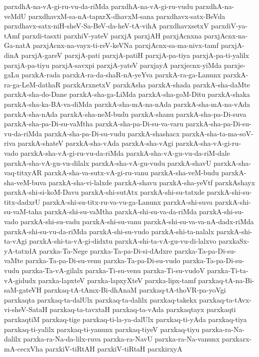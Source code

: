 {parxdhA-na-vA-gi-ru-vu-da-riMda
parxdhA-na-vA-gi-ru-vudu
parxdhA-na-veMdU
parxdhavxM-sa-nA-tapxrX-dhavxM-sana
parxdhavx-satx-BeVda
parxdhavx-satx-niH-sheV-Sa-BeV-da-heV-tA-vihA
parxdhavxsetxV
parxdiV-ya-tAmf
parxdi-tasxti
parxhiV-yateV
parxjA
parxjAH
parxjAcnxna
parxjAcnx-na-Ga-natA
parxjAcnx-na-vayx-ti-reV-keVNa
parxjAcnx-sa-ma-nivx-tamf
parxjA-dinA
parxjA-gareV
parxjA-pati
parxjA-patiH
parxjA-pa-tiya
parxjA-pa-ti-yalilx
parxjA-pa-tiyu
parxjA-savxpi
parxjA-yateV
parxjayA
parxjecnx-yiMda
parxje-gaLu
parxkA-rada
parxkA-ra-da-shaR-nA-yeYva
parxkA-ra-ga-Lanunx
parxkA-ra-ga-LeM-dathaR
parxkArxnetxV
parxkAsha
parxkA-shada
parxkA-sha-daMte
parxkA-sha-do-Dane
parxkA-sha-ga-LiMda
parxkA-sha-goM-Ditu
parxkA-shaka
parxkA-sha-ka-BA-va-diMda
parxkA-sha-mA-na-nAda
parxkA-sha-mA-na-vAda
parxkA-sha-nAda
parxkA-sha-neM-budu
parxkA-shanu
parxkA-sha-pa-Di-suva
parxkA-sha-pa-Di-su-vaMtha
parxkA-sha-pa-Di-su-va-varu
parxkA-sha-pa-Di-su-vu-da-riMda
parxkA-sha-pa-Di-su-vudu
parxkA-shashacx
parxkA-sha-ta-ma-soV-riva
parxkA-shateV
parxkA-sha-vAda
parxkA-sha-vAgi
parxkA-sha-vA-gi-ru-vado
parxkA-sha-vA-gi-ru-vu-da-riMda
parxkA-sha-vA-gu-vu-da-riM-dale
parxkA-sha-vA-gu-vu-dilalx
parxkA-sha-vA-gu-vudu
parxkA-shavU
parxkA-sha-vaq-titxyAR
parxkA-sha-va-sutx-vA-gi-ru-vanu
parxkA-sha-veM-budu
parxkA-sha-veM-buva
parxkA-sha-vi-lalxde
parxkA-shavu
parxkA-sha-yeVtf
parxkAshayx
parxkA-shi-si-koM-Davu
parxkA-shi-sutAtx
parxkA-shi-su-tatxde
parxkA-shi-su-titx-dadxrU
parxkA-shi-su-titx-ru-va-vu-ga-Lanunx
parxkA-shi-suva
parxkA-shi-su-vaM-taha
parxkA-shi-su-vaMtha
parxkA-shi-su-va-da-riMda
parxkA-shi-su-vado
parxkA-shi-su-vadu
parxkA-shi-su-vanu
parxkA-shi-su-va-va-nA-dadx-riMda
parxkA-shi-su-vu-da-riMda
parxkA-shi-su-vudo
parxkA-shi-ta-nalalx
parxkA-shi-ta-vAgi
parxkA-shi-ta-vA-gi-didxtu
parxkA-shi-ta-vA-gu-vu-di-lalxvo
parxkaSx-yA-tatxdA
parxka-Ta-Nege
parxka-Ta-pa-Di-si-dAdxre
parxka-Ta-pa-Di-su-vaMte
parxka-Ta-pa-Di-su-venu
parxka-Ta-pa-Di-su-vudo
parxka-Ta-pa-Di-su-vudu
parxka-Ta-vA-gilalx
parxka-Ti-su-venu
parxka-Ti-su-vudoV
parxka-Ti-ta-vA-gidudx
parxka-lapxteV
parxka-lapxyXteV
parxka-lipx-tamf
parxkaq-tA-na-Bi-saM-gateVH
parxkaq-tA-tAmx-Bi-dhAnaM
parxkaq-tA-thoVR-pa-yoVgi
parxkaqta
parxkaq-ta-dalUlx
parxkaq-ta-dalilx
parxkaq-takekx
parxkaq-ta-tAvx-vi-sheV-SataH
parxkaq-ta-tavxtaH
parxkaq-ta-vAda
parxkaqtayx
parxkaqti
parxkaqtiM
parxkaq-tige
parxkaq-ti-la-ya-dalUlx
parxkaq-ti-yAda
parxkaq-tiya
parxkaq-ti-yalilx
parxkaq-ti-yanunx
parxkaq-tiyeV
parxkaq-tiyu
parxka-ra-Na-dalilx
parxka-ra-Na-da-lilx-ruva
parxka-ra-NavU
parxka-ra-Na-vanunx
parxkarx-mA-cecxVha
parxkiV-tiRtAH
parxkiV-tiRtaH
parxkirxyA
}
